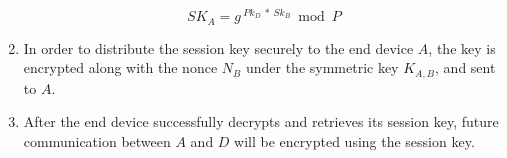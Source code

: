 \begin{enumerate}
\begin{equation}
\label{eq:ska}
SK_A = g^{\ Pk_{D}\ *\ Sk_B} \bmod P
\end{equation}

\item In order to distribute the session key securely to the end device $A$, the key is encrypted along with the nonce $N_B$ under the symmetric key $K_{A,B}$, and sent to $A$.

\item After the end device successfully decrypts and retrieves its session key, future communication between $A$ and $D$ will be encrypted using the session key. 

\end{enumerate}




%
%


